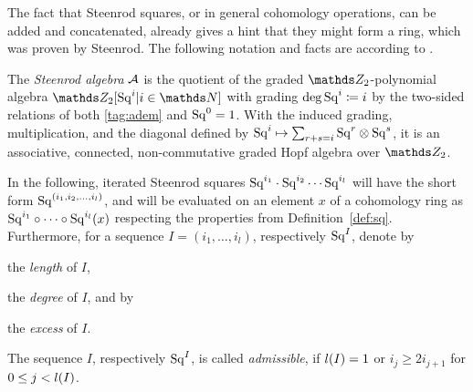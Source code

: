 The fact that Steenrod squares, or in general cohomology operations,
can be added and concatenated, already gives a hint that they might
form a ring, which was proven by Steenrod. The following notation and
facts are according to \cite[Chap.~6]{mosher}.
\begin{Def}\label{def:steenrodalgebra}
  The \emph{Steenrod algebra} $\mathcal{A}$ is the quotient
  of the graded $\Zmod2$-polynomial algebra
  $\Zmod2[\Sq i|i\in\Nat]$ with grading $\deg \mathrm{Sq}^{i}\coloneqq i$
  by the two-sided relations of both \ref{tag:adem} and $\mathrm{Sq}^{0}=1$.
  With the induced grading, multiplication, and the diagonal defined
  by $\mathrm{Sq}^{i}\mapsto\sum_{r+s=i}\mathrm{Sq}^{r}\otimes\mathrm{Sq}^{s}$, it is an
  associative, connected, non-commutative graded Hopf algebra over
  $\Zmod2$.
\end{Def}
\begin{Not}
  In the following, iterated Steenrod squares
  $\mathrm{Sq}^{i_1}\cdot\mathrm{Sq}^{i_2}\dotsm\mathrm{Sq}^{i_l}$ will have the short form
  $\mathrm{Sq}^{(i_1,i_2,\dotsc,i_l)}$,
  and will be evaluated on an element $x$ of a cohomology ring as
  $\mathrm{Sq}^{i_1}\circ\dotsb\circ\mathrm{Sq}^{i_l}(x)$ respecting the
  properties from Definition~\ref{def:sq}.
  Furthermore, for a sequence $I=(i_1,\dotsc,i_l)$,
  respectively $\mathrm{Sq}^{I}$, denote by
  \begin{description}[labelindent=1em]
  \item[$\l(I)\coloneqq l$] the \emph{length} of $I$,
  \item[$\d(I)\coloneqq \sum_{j=1}^{l} i_j$] the \emph{degree} of $I$,
    and by
  \item[$\e(I)\coloneqq 2i_1-\d(I)=\sum_{j=1}^{l-1}(i_j-2i_{j+1})$]
    the \emph{excess} of $I$.
  \end{description}
  The sequence $I$, respectively $\mathrm{Sq}^{I}$, is called \emph{admissible},
  if $l(I)=1$ or $i_j\geq 2i_{j+1}$ for $0\leq j<l(I)$.
\end{Not}

